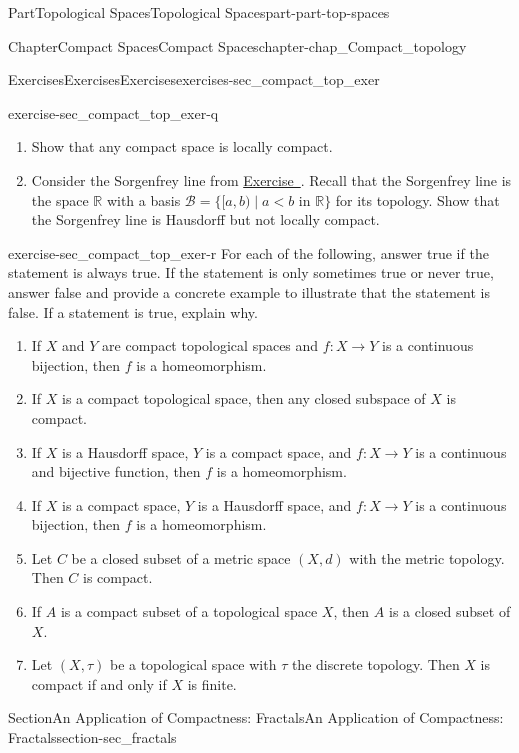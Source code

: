 \documentclass[oneside,10pt,]{book}
\newcommand{\xreffont}{\relax}
\numberwithin{equation}{chapter}
\newcommand{\R}{\mathbb{R}}
\newcommand{\B}{\mathcal{B}}
\newcommand{\lt}{<}
\begin{document}
\begin{partptx}{Part}{Topological Spaces}{}{Topological Spaces}{}{}{part-part-top-spaces}
\begin{chapterptx}{Chapter}{Compact Spaces}{}{Compact Spaces}{}{}{chapter-chap_Compact_topology}
\begin{exercises-section}{Exercises}{Exercises}{}{Exercises}{}{}{exercises-sec_compact_top_exer}
\begin{divisionexercise}{16}{}{}{exercise-sec_compact_top_exer-q}
\begin{enumerate}[font=\bfseries,label=(\alph*),ref=\alph*]
\item{}Show that any compact space is locally compact.%
\item{}Consider the Sorgenfrey line from \hyperlink{exercise-ex_Closed_Sets_Sorgenfrey}{Exercise~{\xreffont 5}}. Recall that the Sorgenfrey line is the space \(\R\) with a basis \(\B = \{[a,b) \mid a \lt b \text{ in } \R\}\) for its topology. Show that the Sorgenfrey line is Hausdorff but not locally compact.%
\end{enumerate}%
\end{divisionexercise}%
\begin{divisionexercise}{17}{}{}{exercise-sec_compact_top_exer-r}%
For each of the following, answer true if the statement is always true. If the statement is only sometimes true or never true, answer false and provide a concrete example to illustrate that the statement is false. If a statement is true, explain why.%
\begin{enumerate}[font=\bfseries,label=(\alph*),ref=\alph*]%
\item{}If \(X\) and \(Y\) are compact topological spaces and \(f: X \to Y\) is a continuous bijection, then \(f\) is a homeomorphism.%
\item{}If \(X\) is a compact topological space, then any closed subspace of \(X\) is compact.%
\item{}If \(X\) is a Hausdorff space, \(Y\) is a compact space, and \(f : X \to Y\) is a continuous and bijective function, then \(f\) is a homeomorphism.%
\item{}If \(X\) is a compact space, \(Y\) is a Hausdorff space, and \(f : X \to Y\) is a continuous bijection, then \(f\) is a homeomorphism.%
\item{}Let \(C\) be a closed subset of a metric space \((X, d)\) with the metric topology. Then \(C\) is compact.%
\item{}If \(A\) is a compact subset of a topological space \(X\), then \(A\) is a closed subset of \(X\).%
\item{}Let \((X,\tau)\) be a topological space with \(\tau\) the discrete topology. Then \(X\) is compact if and only if \(X\) is finite.%
\end{enumerate}%
\end{divisionexercise}%
\end{exercises-section}
%
%
\typeout{************************************************}
\typeout{************************************************}
%
\begin{sectionptx}{Section}{An Application of Compactness: Fractals}{}{An Application of Compactness: Fractals}{}{}{section-sec_fractals}

\end{sectionptx}
\end{chapterptx}
\end{partptx}
\end{document}
